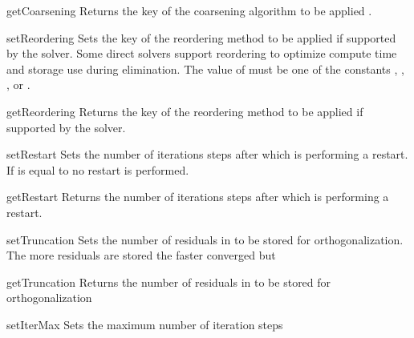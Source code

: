 \begin{methoddesc}[SolverOptions]{getCoarsening}{}
Returns the key of the coarsening algorithm to be applied \AMG.
\end{methoddesc}

\begin{methoddesc}[SolverOptions]{setReordering}{}
Sets the key of the reordering method to be applied if supported by the solver. Some direct solvers support reordering to optimize compute time and storage use during elimination. The value of  must be one of the constants
 , , 
        , or .
\end{methoddesc}

\begin{methoddesc}[SolverOptions]{getReordering}{}
Returns the key of the reordering method to be applied if supported by the solver.
\end{methoddesc}

\begin{methoddesc}[SolverOptions]{setRestart}{}
Sets the number of iterations steps after which \GMRES is performing a restart.
If  is equal to  no restart is performed.
\end{methoddesc}


\begin{methoddesc}[SolverOptions]{getRestart}{}
Returns the number of iterations steps after which \GMRES is performing a restart.
\end{methoddesc}

\begin{methoddesc}[SolverOptions]{setTruncation}{}
Sets the number of residuals in \GMRES to be stored for orthogonalization.  The more residuals are stored the faster \GMRES converged but
\end{methoddesc}

\begin{methoddesc}[SolverOptions]{getTruncation}{}
Returns the number of residuals in \GMRES to be stored for orthogonalization
\end{methoddesc}


\begin{methoddesc}[SolverOptions]{setIterMax}{}
Sets the maximum number of iteration steps
\end{methoddesc}

